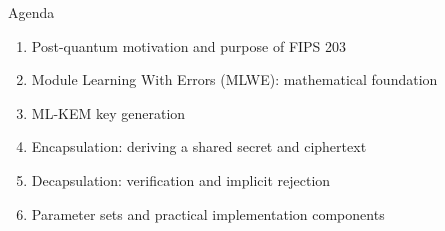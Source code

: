 \documentclass[aspectratio=169,11pt]{beamer}
\newcommand{\source}[1]{\par\vspace{-0.15cm}\hfill{\fontsize{4.5}{5.2}\selectfont\color{Slate!65}Source: NIST FIPS 203, #1.}}
\begin{document}
\begin{frame}{Agenda}
  \begin{enumerate}
    \setlength{\itemsep}{0.62em}
    \item Post-quantum motivation and purpose of FIPS 203
    \item Module Learning With Errors (MLWE): mathematical foundation
    \item ML-KEM key generation
    \item Encapsulation: deriving a shared secret and ciphertext
    \item Decapsulation: verification and implicit rejection
    \item Parameter sets and practical implementation components
  \end{enumerate}
\end{frame}
\end{document}
